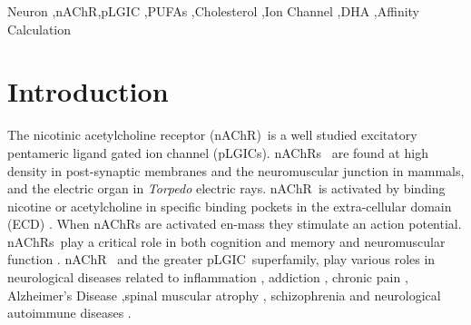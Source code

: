 \documentclass[preprint,3p,9pt,times,onecolumn]{elsarticle}
\newcommand{\nachr}{nAChR}
\newcommand{\plgic}{pLGIC}
\begin{document}
\begin{frontmatter}
\begin{abstract}
\end{abstract}

\begin{keyword}
Neuron \sep \nachr \sep pLGIC \sep PUFAs \sep Cholesterol \sep Ion Channel \sep DHA \sep Affinity Calculation

\end{keyword}

\end{frontmatter}

\linenumbers

\section{Introduction}
\label{Intro}

The nicotinic acetylcholine receptor (\nachr)~is a well studied excitatory pentameric ligand gated ion channel (\plgic s). \nachr s~ are found at high density in post-synaptic membranes and the neuromuscular junction in mammals, and the electric organ in \textit{Torpedo} electric rays. \nachr~is activated by binding nicotine or acetylcholine in specific binding pockets in the extra-cellular domain (ECD) \cite{Dacosta2013,Guros2020}. When \nachr s are activated en-mass they stimulate an action potential. \nachr s~play a critical role in both cognition and memory\cite{Henault2015} and neuromuscular function \cite{Mukhtasimova2016,Kalamida2007}. \nachr~ and the greater \plgic~superfamily, play various roles in neurological diseases related to inflammation \cite{Taly2009,Cornelison2016,Patel2017,Yocum2017,Egea2015},  addiction \cite{Cornelison2016}, chronic pain \cite{Xiong2012}, Alzheimer's Disease \cite{Walstab2010,Picciotto_Neuroprotection_2008,MartinRuiz_4_1999,Kalamida2007},spinal muscular atrophy \cite{Arnold_Reduced_2004}, schizophrenia \cite{Haydar2010,Kalamida2007} and neurological autoimmune diseases \cite{Lennon_Immunization_2003, Kumari2008}.
\end{document}

